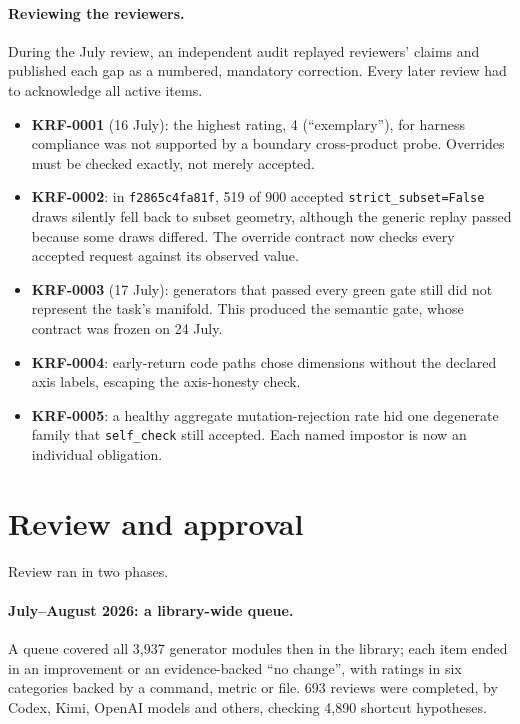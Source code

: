 \documentclass[11pt]{article}
\newcommand{\gen}[1]{\texttt{#1}}
\begin{document}
\paragraph{Reviewing the reviewers.} During the July review, an independent
audit replayed reviewers' claims and published each gap as a numbered,
mandatory correction. Every later review had to acknowledge all active items.
\begin{itemize}[nosep]
  \item \textbf{KRF-0001} (16 July): the highest rating, 4 (``exemplary''), for
  harness compliance was not supported by a boundary cross-product probe. Overrides must be checked exactly, not
  merely accepted.
  \item \textbf{KRF-0002}: in \gen{f2865c4fa81f}, 519 of 900 accepted
  \texttt{strict\_subset=False} draws silently fell back to subset geometry,
  although the generic replay passed because some draws differed. The override
  contract now checks every accepted request against its observed value.
  \item \textbf{KRF-0003} (17 July): generators that passed every green gate
  still did not represent the task's manifold. This produced the semantic gate,
  whose contract was frozen on 24 July.
  \item \textbf{KRF-0004}: early-return code paths chose dimensions without the
  declared axis labels, escaping the axis-honesty check.
  \item \textbf{KRF-0005}: a healthy aggregate mutation-rejection rate hid one
  degenerate family that \texttt{self\_check} still accepted. Each named impostor
  is now an individual obligation.
\end{itemize}

\section{Review and approval}
\label{sec:review}

Review ran in two phases.

\paragraph{July--August 2026: a library-wide queue.} A queue covered
all 3,937 generator modules then in the library; each item ended in an
improvement or an evidence-backed ``no change'', with ratings in six categories
backed by a command, metric or file. 693 reviews were completed, by Codex,
Kimi, OpenAI models and others, checking 4,890 shortcut hypotheses.
\end{document}
